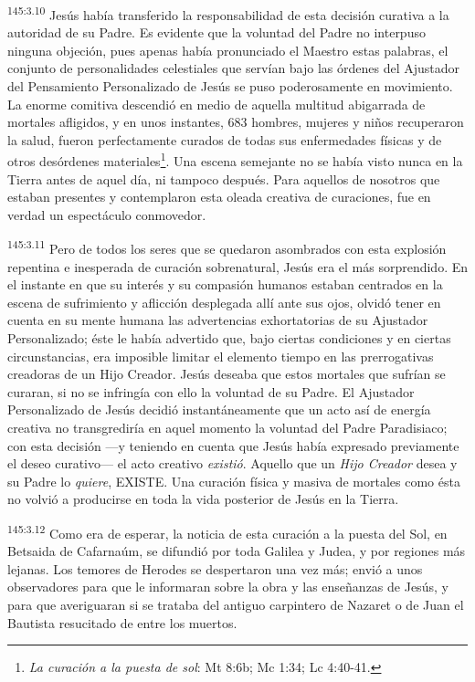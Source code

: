 \par 
\textsuperscript{145:3.10} Jesús había transferido la responsabilidad de esta decisión curativa a la autoridad de su Padre. Es evidente que la voluntad del Padre no interpuso ninguna objeción, pues apenas había pronunciado el Maestro estas palabras, el conjunto de personalidades celestiales que servían bajo las órdenes del Ajustador del Pensamiento Personalizado de Jesús se puso poderosamente en movimiento. La enorme comitiva descendió en medio de aquella multitud abigarrada de mortales afligidos, y en unos instantes, 683 hombres, mujeres y niños recuperaron la salud, fueron perfectamente curados de todas sus enfermedades físicas y de otros desórdenes materiales\footnote{\textit{La curación a la puesta de sol}: Mt 8:6b; Mc 1:34; Lc 4:40-41.}. Una escena semejante no se había visto nunca en la Tierra antes de aquel día, ni tampoco después. Para aquellos de nosotros que estaban presentes y contemplaron esta oleada creativa de curaciones, fue en verdad un espectáculo conmovedor.

\par 
\textsuperscript{145:3.11} Pero de todos los seres que se quedaron asombrados con esta explosión repentina e inesperada de curación sobrenatural, Jesús era el más sorprendido. En el instante en que su interés y su compasión humanos estaban centrados en la escena de sufrimiento y aflicción desplegada allí ante sus ojos, olvidó tener en cuenta en su mente humana las advertencias exhortatorias de su Ajustador Personalizado; éste le había advertido que, bajo ciertas condiciones y en ciertas circunstancias, era imposible limitar el elemento tiempo en las prerrogativas creadoras de un Hijo Creador. Jesús deseaba que estos mortales que sufrían se curaran, si no se infringía con ello la voluntad de su Padre. El Ajustador Personalizado de Jesús decidió instantáneamente que un acto así de energía creativa no transgrediría en aquel momento la voluntad del Padre Paradisiaco; con esta decisión ---y teniendo en cuenta que Jesús había expresado previamente el deseo curativo--- el acto creativo \textit{existió}. Aquello que un \textit{Hijo Creador} desea y su Padre lo \textit{quiere}, EXISTE. Una curación física y masiva de mortales como ésta no volvió a producirse en toda la vida posterior de Jesús en la Tierra.

\par 
\textsuperscript{145:3.12} Como era de esperar, la noticia de esta curación a la puesta del Sol, en Betsaida de Cafarnaúm, se difundió por toda Galilea y Judea, y por regiones más lejanas. Los temores de Herodes se despertaron una vez más; envió a unos observadores para que le informaran sobre la obra y las enseñanzas de Jesús, y para que averiguaran si se trataba del antiguo carpintero de Nazaret o de Juan el Bautista resucitado de entre los muertos.

